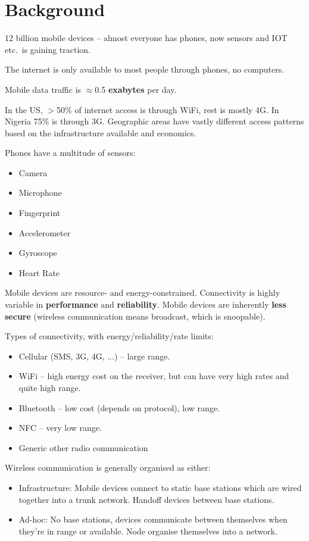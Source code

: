 \documentclass[a4paper, 11pt]{article}
\begin{document}
\section*{Background}
{
    12 billion mobile devices -- almost everyone has phones, now sensors and IOT etc.\ is gaining traction.

    The internet is only available to most people through phones, no computers.

    Mobile data traffic is \(\approx\)0.5 \textbf{exabytes} per day.

    In the US, \(>\)50\% of internet access is through WiFi, rest is mostly 4G. In Nigeria 75\% is through 3G. Geographic areas have vastly different access patterns based on the infrastructure available and economics.

    Phones have a multitude of sensors:
    \begin{itemize}
    \item Camera
    \item Microphone
    \item Fingerprint
    \item Accelerometer
    \item Gyroscope
    \item Heart Rate
    \end{itemize}

    Mobile devices are resource- and energy-constrained. Connectivity is highly variable in \textbf{performance} and \textbf{reliability}. Mobile devices are inherently \textbf{less secure} (wireless communication means broadcast, which is snoopable).

    Types of connectivity, with energy/reliability/rate limits:
    \begin{itemize}
    \item Cellular (SMS, 3G, 4G, ...) -- large range.
    \item WiFi -- high energy cost on the receiver, but can have very high rates and quite high range.
    \item Bluetooth -- low cost (depends on protocol), low range.
    \item NFC -- very low range.
    \item Generic other radio communication
    \end{itemize}

    Wireless communication is generally organised as either:
    \begin{itemize}
    \item Infrastructure: Mobile devices connect to static base stations which are wired together into a trunk network. Handoff devices between base stations.
    \item Ad-hoc: No base stations, devices communicate between themselves when they're in range or available. Node organise themselves into a network.
    \end{itemize}

}
\end{document}
